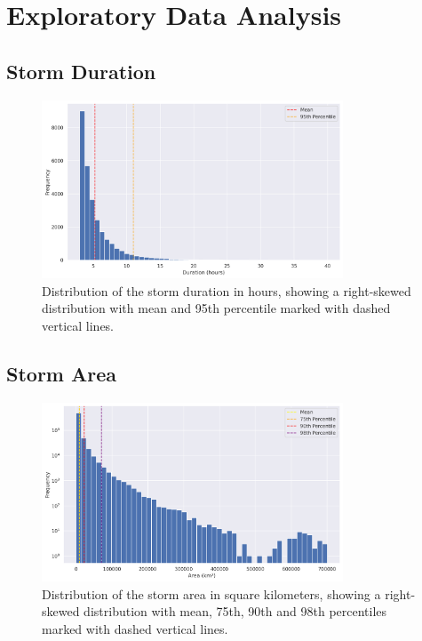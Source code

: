 \chapter{Exploratory Data Analysis}
\label{appn:exploration}

\section{Storm Duration}
\label{appn:storm-duration}

\begin{figure}[ht]
    \centering
    \includegraphics[width=0.8\textwidth]{../figures/generated/exploration/storm_duration_hist.png}
    \caption{Distribution of the storm duration in hours, showing a right-skewed distribution with mean and 95th percentile marked with dashed vertical lines.}
    \label{fig:avg_storm_duration}
\end{figure}

\clearpage

\section{Storm Area}
\label{appn:storm-area}

\begin{figure}[ht]
    \centering
    \includegraphics[width=0.8\textwidth]{../figures/generated/exploration/storm_area_hist.png}
    \caption{Distribution of the storm area in square kilometers, showing a right-skewed distribution with mean, 75th, 90th and 98th percentiles marked with dashed vertical lines.}
    \label{fig:avg_storm_area}
\end{figure}
